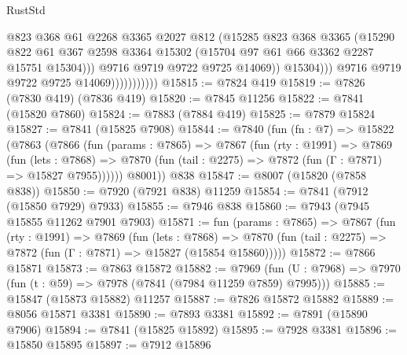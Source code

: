 \begin{lexlean}{RustStd}
\begin{coremodule}
                                    @823
                                    @368
                                    @61
                                    @2268
                                    @3365
                                    @2027
                                    @812
                                    (@15285
                                      @823
                                      @368
                                      @3365
                                      (@15290
                                        @822
                                        @61
                                        @367
                                        @2598
                                        @3364
                                        @15302
                                        (@15704 @97 @61 @66 @3362 @2287 @15751 @15304)))
                                    @9716
                                    @9719
                                    @9722
                                    @9725
                                    @14069))
                                @15304)))
                          @9716
                          @9719
                          @9722
                          @9725
                          @14069)))))))))))
@15815 := @7824 @419
@15819 := @7826 (@7830 @419) (@7836 @419)
@15820 := @7845 @11256
@15822 := @7841 (@15820 @7860)
@15824 := @7883 (@7884 @419)
@15825 := @7879 @15824
@15827 := @7841 (@15825 @7908)
@15844 := @7840
    (fun (fn : @7) =>
    @15822
      (@7863
        (@7866
          (fun (params : @7865) =>
          @7867
            (fun (rty : @1991) =>
            @7869
              (fun (lets : @7868) =>
              @7870 (fun (tail : @2275) => @7872 (fun (Γ : @7871) => @15827 @7955))))))
        @8001))
    @838
@15847 := @8007 (@15820 (@7858 @838))
@15850 := @7920 (@7921 @838) @11259
@15854 := @7841 (@7912 (@15850 @7929) @7933)
@15855 := @7946 @838
@15860 := @7943 (@7945 @15855 @11262 @7901 @7903)
@15871 := fun (params : @7865) =>
  @7867
    (fun (rty : @1991) =>
    @7869
      (fun (lets : @7868) =>
      @7870 (fun (tail : @2275) => @7872 (fun (Γ : @7871) => @15827 (@15854 @15860)))))
@15872 := @7866 @15871
@15873 := @7863 @15872
@15882 := @7969
    (fun (U : @7968) => @7970 (fun (t : @59) => @7978 (@7841 (@7984 @11259 @7859) @7995)))
@15885 := @15847 (@15873 @15882) @11257
@15887 := @7826 @15872 @15882
@15889 := @8056 @15871 @3381
@15890 := @7893 @3381
@15892 := @7891 (@15890 @7906)
@15894 := @7841 (@15825 @15892)
@15895 := @7928 @3381
@15896 := @15850 @15895
@15897 := @7912 @15896

\end{coremodule}
\end{lexlean}
